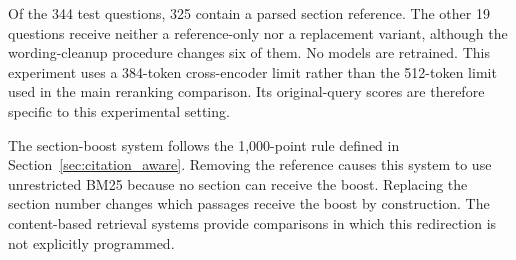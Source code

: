 \documentclass[pdflatex,sn-basic]{sn-jnl}%
\theoremstyle{thmstyleone}%
\theoremstyle{thmstyletwo}%
\theoremstyle{thmstylethree}%
\begin{document}
Of the 344 test questions, 325 contain a parsed section reference. The other
19 questions receive neither a reference-only nor a replacement variant,
although the wording-cleanup procedure changes six of them. No models are
retrained. This experiment uses a 384-token cross-encoder limit rather than
the 512-token limit used in the main reranking comparison. Its original-query
scores are therefore specific to this experimental setting.

The section-boost system follows the 1,000-point rule defined in
Section~\ref{sec:citation_aware}. Removing the reference causes this system
to use unrestricted BM25 because no section can receive the boost. Replacing
the section number changes which passages receive the boost by construction.
The content-based retrieval systems provide comparisons in which this
redirection is not explicitly programmed.
\end{document}
